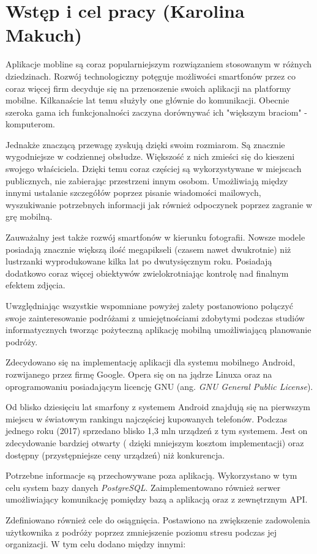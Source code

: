 \documentclass[10pt,twoside,a4paper]{report}
\begin{document}
\chapter{Wstęp i cel pracy (Karolina Makuch)}
\par Aplikacje mobline są coraz popularniejszym rozwiązaniem stosowanym w różnych dziedzinach. Rozwój technologiczny potęguje możliwości smartfonów przez co coraz więcej firm decyduje się na przenoszenie swoich aplikacji na platformy mobilne. Kilkanaście lat temu  służyły one głównie do komunikacji. Obecnie szeroka gama ich funkcjonalności zaczyna dorównywać ich "większym braciom" - komputerom.
\par Jednakże znaczącą przewagę zyskują dzięki swoim rozmiarom. Są znacznie wygodniejsze w codziennej obsłudze. Większość z nich zmieści się do kieszeni swojego właściciela. Dzięki temu coraz częściej są wykorzystywane w miejscach publicznych, nie zabierając przestrzeni innym osobom. Umożliwiają między innymi ustalanie szczegółów poprzez pisanie wiadomości mailowych, wyszukiwanie potrzebnych informacji jak również odpoczynek poprzez zagranie w grę mobilną.
\par Zauważalny jest także rozwój smartfonów w kierunku fotografii. Nowsze modele posiadają znacznie większą ilość megapikseli (czasem nawet dwukrotnie) niż lustrzanki wyprodukowane kilka lat po dwutysięcznym roku. Posiadają dodatkowo coraz więcej obiektywów zwielokrotniając kontrolę nad finalnym efektem zdjęcia.
\par Uwzględniając wszystkie wspomniane powyżej zalety postanowiono połączyć swoje zainteresowanie podróżami z umiejętnościami zdobytymi podczas studiów informatycznych tworząc pożyteczną aplikację mobilną umożliwiającą planowanie podróży.
\par Zdecydowano się na implementację aplikacji dla systemu mobilnego Android, rozwijanego przez firmę Google. Opera się on na jądrze Linuxa oraz na oprogramowaniu posiadającym licencję GNU (ang. \textit{GNU General Public License}).
 \par Od blisko dziesięciu lat smarfony z systemem Android znajdują się na pierwszym miejscu w światowym rankingu najczęściej kupowanych telefonów. Podczas jednego roku (2017) sprzedano blisko 1,3 mln urządzeń z tym systemem. Jest on zdecydowanie bardziej otwarty ( dzięki mniejszym kosztom implementacji) oraz dostępny (przystępniejsze ceny urządzeń) niż konkurencja.
\par Potrzebne informacje są przechowywane poza aplikacją. Wykorzystano w tym celu system bazy danych \textit{PostgreSQL}. Zaimplementowano również serwer umożliwiający komunikację pomiędzy bazą a aplikacją oraz z zewnętrznym API.
\par Zdefiniowano również cele do osiągnięcia. Postawiono na zwiększenie zadowolenia użytkownika z podróży poprzez zmniejszenie poziomu stresu podczas jej organizacji. W tym celu dodano między innymi:
\end{document}
